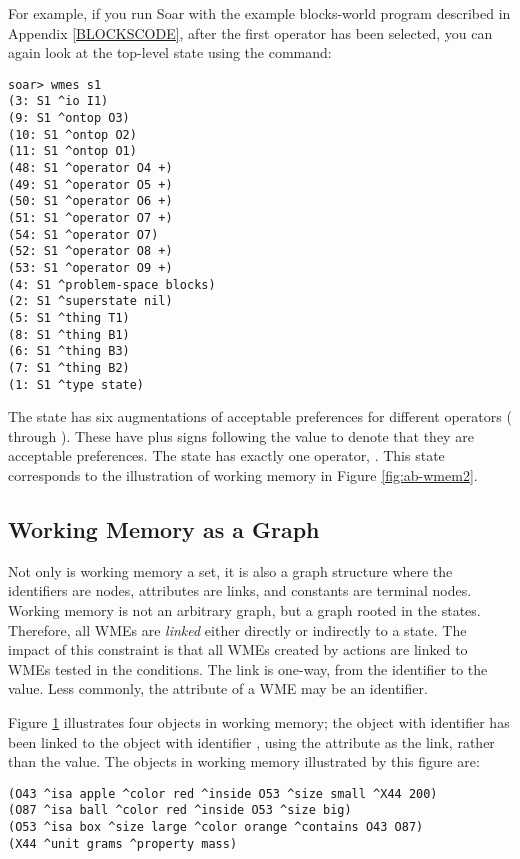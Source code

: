 For example, if you run Soar with the example blocks-world program described
in Appendix \ref{BLOCKSCODE}, after the first operator
has been selected, you can again look at the top-level state using the
 command:

\begin{verbatim}
soar> wmes s1
(3: S1 ^io I1)
(9: S1 ^ontop O3)
(10: S1 ^ontop O2)
(11: S1 ^ontop O1)
(48: S1 ^operator O4 +)
(49: S1 ^operator O5 +)
(50: S1 ^operator O6 +)
(51: S1 ^operator O7 +)
(54: S1 ^operator O7)
(52: S1 ^operator O8 +)
(53: S1 ^operator O9 +)
(4: S1 ^problem-space blocks)
(2: S1 ^superstate nil)
(5: S1 ^thing T1)
(8: S1 ^thing B1)
(6: S1 ^thing B3)
(7: S1 ^thing B2)
(1: S1 ^type state)
\end{verbatim} \vspace{12pt}

The state  has six augmentations of acceptable preferences for
different operators ( through ). These have plus signs
following the value to denote that they are acceptable preferences. The state
has exactly one operator, . This state corresponds to the
illustration of working memory in Figure \ref{fig:ab-wmem2}.

\subsection{Working Memory as a Graph}

Not only is working memory a set, it is also a graph structure where the
identifiers are nodes, attributes are links, and constants are terminal
nodes.  Working memory is not an arbitrary graph, but a graph rooted in
the states.  Therefore, all WMEs are \emph{linked} either directly or
indirectly to a state.  The impact of this constraint is that all WMEs
created by actions are linked to WMEs tested in the conditions.  The
link is one-way, from the identifier to the value. Less commonly, the
attribute of a WME may be an identifier.

\begin{figure}
\label{fig:o43net}
\end{figure}

Figure \ref{fig:o43net} illustrates four objects in working memory; the
object with identifier  has been linked to the object with
identifier , using the attribute as the link, rather than the
value. The objects in working memory illustrated by this figure are:
\begin{verbatim}
(O43 ^isa apple ^color red ^inside O53 ^size small ^X44 200) 
(O87 ^isa ball ^color red ^inside O53 ^size big)
(O53 ^isa box ^size large ^color orange ^contains O43 O87)
(X44 ^unit grams ^property mass)
\end{verbatim} \vspace{12pt}

